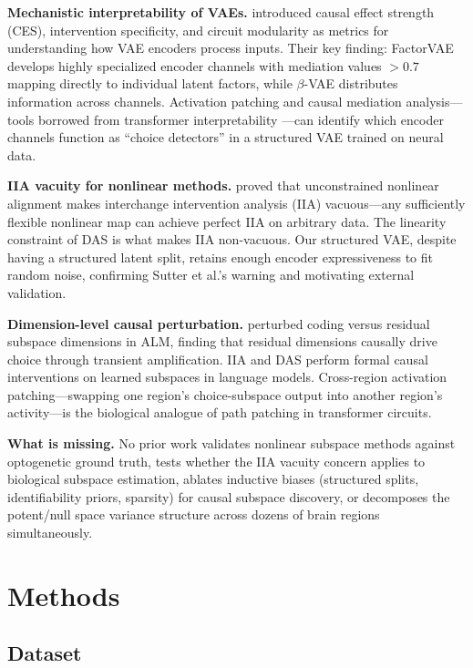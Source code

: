\documentclass{article}
\begin{document}
\textbf{Mechanistic interpretability of VAEs.} \citet{martinez2025vae_circuits} introduced causal effect strength (CES), intervention specificity, and circuit modularity as metrics for understanding how VAE encoders process inputs. Their key finding: FactorVAE develops highly specialized encoder channels with mediation values $> 0.7$ mapping directly to individual latent factors, while $\beta$-VAE distributes information across channels. Activation patching and causal mediation analysis---tools borrowed from transformer interpretability \citep{geiger2024causal}---can identify which encoder channels function as ``choice detectors'' in a structured VAE trained on neural data.

\textbf{IIA vacuity for nonlinear methods.} \citet{sutter2025iia} proved that unconstrained nonlinear alignment makes interchange intervention analysis (IIA) vacuous---any sufficiently flexible nonlinear map can achieve perfect IIA on arbitrary data. The linearity constraint of DAS \citep{geiger2024causal} is what makes IIA non-vacuous. Our structured VAE, despite having a structured latent split, retains enough encoder expressiveness to fit random noise, confirming Sutter et al.'s warning and motivating external validation.

\textbf{Dimension-level causal perturbation.} \citet{pereira2025residual} perturbed coding versus residual subspace dimensions in ALM, finding that residual dimensions causally drive choice through transient amplification. IIA \citep{geiger2024finding} and DAS \citep{geiger2024causal} perform formal causal interventions on learned subspaces in language models. Cross-region activation patching---swapping one region's choice-subspace output into another region's activity---is the biological analogue of path patching in transformer circuits.

\textbf{What is missing.} No prior work validates nonlinear subspace methods against optogenetic ground truth, tests whether the IIA vacuity concern applies to biological subspace estimation, ablates inductive biases (structured splits, identifiability priors, sparsity) for causal subspace discovery, or decomposes the potent/null space variance structure across dozens of brain regions simultaneously.

\section{Methods}

\subsection{Dataset}
\end{document}
